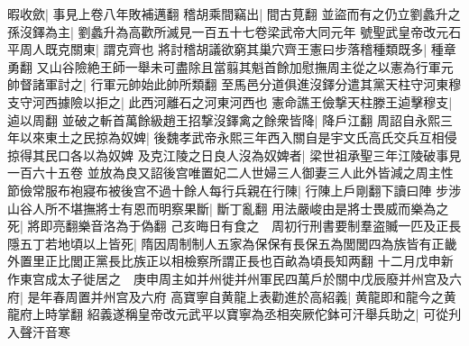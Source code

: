 暇收歛|{
	事見上卷八年敗補邁翻}
稽胡乘間竊出|{
	間古莧翻}
並盜而有之仍立劉蠡升之孫沒鐸為主|{
	劉蠡升為高歡所滅見一百五十七卷梁武帝大同元年}
號聖武皇帝改元石平周人既克關東|{
	謂克齊也}
將討稽胡議欲窮其巢穴齊王憲曰步落稽種類既多|{
	種章勇翻}
又山谷險絶王師一舉未可盡除且當翦其魁首餘加慰撫周主從之以憲為行軍元帥督諸軍討之|{
	行軍元帥始此帥所類翻}
至馬邑分道俱進沒鐸分遣其黨天柱守河東穆支守河西據險以拒之|{
	此西河離石之河東河西也}
憲命譙王儉撃天柱滕王逌擊穆支|{
	逌以周翻}
並破之斬首萬餘級趙王招撃沒鐸禽之餘衆皆降|{
	降戶江翻}
周詔自永熙三年以來東土之民掠為奴婢|{
	後魏孝武帝永熙三年西入關自是宇文氏高氏交兵互相侵掠得其民口各以為奴婢}
及克江陵之日良人沒為奴婢者|{
	梁世祖承聖三年江陵破事見一百六十五卷}
並放為良又詔後宫唯置妃二人世婦三人御妻三人此外皆減之周主性節儉常服布袍寢布被後宫不過十餘人每行兵親在行陳|{
	行陳上戶剛翻下讀曰陣}
步涉山谷人所不堪撫將士有恩而明察果斷|{
	斷丁亂翻}
用法嚴峻由是將士畏威而樂為之死|{
	將即亮翻樂音洛為于偽翻}
己亥晦日有食之　周初行刑書要制羣盗贓一匹及正長隱五丁若地頃以上皆死|{
	隋因周制制人五家為保保有長保五為閭閭四為族皆有正畿外置里正比閭正黨長比族正以相檢察所謂正長也百畝為頃長知两翻}
十二月戊申新作東宫成太子徙居之　庚申周主如并州徙并州軍民四萬戶於關中戊辰廢并州宫及六府|{
	是年春周置并州宫及六府}
高寶寧自黄龍上表勸進於高紹義|{
	黄龍即和龍今之黄龍府上時掌翻}
紹義遂稱皇帝改元武平以寶寧為丞相突厥佗鉢可汗舉兵助之|{
	可從刋入聲汗音寒}


